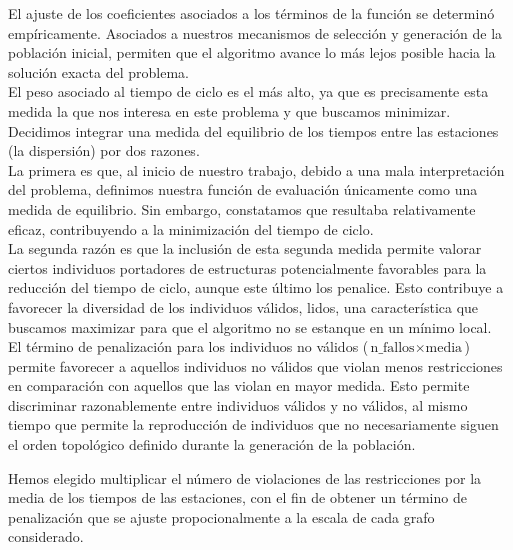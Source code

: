 \documentclass[12pt]{report}
\begin{document}
El ajuste de los coeficientes asociados a los términos de la función se determinó empíricamente. Asociados a nuestros mecanismos de selección y generación de la población inicial, permiten que el algoritmo avance lo más lejos posible hacia la solución exacta del problema.\\

El peso asociado al tiempo de ciclo es el más alto, ya que es precisamente esta medida la que nos interesa en este problema y que buscamos minimizar.\\

Decidimos integrar una medida del equilibrio de los tiempos entre las estaciones (la dispersión) por dos razones.\\
La primera es que, al inicio de nuestro trabajo, debido a una mala interpretación del problema, definimos nuestra función de evaluación únicamente como una medida de equilibrio. Sin embargo, constatamos que resultaba relativamente eficaz, contribuyendo a la minimización del tiempo de ciclo.\\
La segunda razón es que la inclusión de esta segunda medida permite valorar ciertos individuos portadores de estructuras potencialmente favorables para la reducción del tiempo de ciclo, aunque este último los penalice. Esto contribuye a favorecer la diversidad de los individuos válidos, lidos, una característica que buscamos maximizar para que el algoritmo no se estanque en un mínimo local.\\

El término de penalización para los individuos no válidos (\(\text{n\_fallos} \times \text{media}\)) permite favorecer a aquellos individuos no válidos que violan menos restricciones en comparación con aquellos que las violan en mayor medida. Esto permite discriminar razonablemente entre individuos válidos y no válidos, al mismo tiempo que permite la reproducción de individuos que no necesariamente siguen el orden topológico definido durante la generación de la población.

Hemos elegido multiplicar el número de violaciones de las restricciones por la media de los tiempos de las estaciones, con el fin de obtener un término de penalización que se ajuste propocionalmente a la escala de cada grafo considerado.
\end{document}
